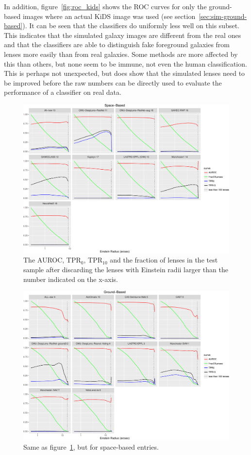 \documentclass{aa}
\begin{document}
In addition, figure~\ref{fig:roc_kids} shows the ROC curves for only the ground-based images where an actual KiDS image was used (see section~\ref{sec:sim-ground-based}).  It can be seen that the classifiers do uniformly less well on this subset.  This indicates that the simulated galaxy images are different from the real ones and that the classifiers are able to distinguish fake foreground galaxies from lenses more easily than from real galaxies.  Some methods are more affected by this than others, but none seem to be immune, not even the human classification. This is perhaps not unexpected, but does show that the simulated lenses need to be improved before the raw numbers can be directly used to evaluate the performance of a classifier on real data.


\begin{figure}
 \includegraphics[width=2\columnwidth]{figures/einstein_space.pdf}
 \caption{The AUROC, TPR$_0$, TPR$_{10}$ and the fraction of lenses in the test sample after discarding the lenses with Einstein radii larger than the number indicated on the x-axis. }
 \label{fig:einstein_space}
\end{figure}

\begin{figure}
 \includegraphics[width=2\columnwidth]{figures/einstein_ground.pdf}
 \caption{Same as figure~\ref{fig:einstein_space}, but for space-based entries.}
 \label{fig:einstein_ground}
\end{figure}
\end{document}
